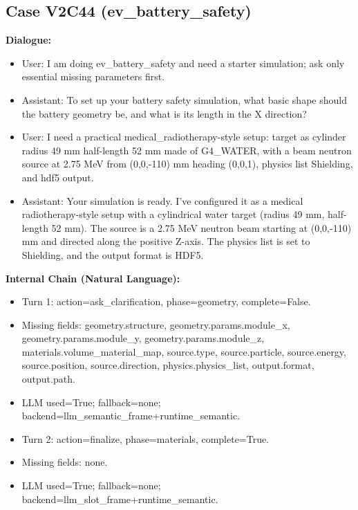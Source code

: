 \documentclass[11pt]{ctexart}
\begin{document}
\subsection{Case V2C44 (ev\_battery\_safety)}
\textbf{Dialogue:}
\begin{itemize}
\item User: I am doing ev\_battery\_safety and need a starter simulation; ask only essential missing parameters first.
\item Assistant: To set up your battery safety simulation, what basic shape should the battery geometry be, and what is its length in the X direction?
\item User: I need a practical medical\_radiotherapy-style setup: target as cylinder radius 49 mm half-length 52 mm made of G4\_WATER, with a beam neutron source at 2.75 MeV from (0,0,-110) mm heading (0,0,1), physics list Shielding, and hdf5 output.
\item Assistant: Your simulation is ready. I've configured it as a medical radiotherapy-style setup with a cylindrical water target (radius 49 mm, half-length 52 mm). The source is a 2.75 MeV neutron beam starting at (0,0,-110) mm and directed along the positive Z-axis. The physics list is set to Shielding, and the output format is HDF5.
\end{itemize}
\textbf{Internal Chain (Natural Language):}
\begin{itemize}
\item Turn 1: action=ask\_clarification, phase=geometry, complete=False.
\item Missing fields: geometry.structure, geometry.params.module\_x, geometry.params.module\_y, geometry.params.module\_z, materials.volume\_material\_map, source.type, source.particle, source.energy, source.position, source.direction, physics.physics\_list, output.format, output.path.
\item LLM used=True; fallback=none; backend=llm\_semantic\_frame+runtime\_semantic.
\item Turn 2: action=finalize, phase=materials, complete=True.
\item Missing fields: none.
\item LLM used=True; fallback=none; backend=llm\_slot\_frame+runtime\_semantic.
\end{itemize}
\end{document}
